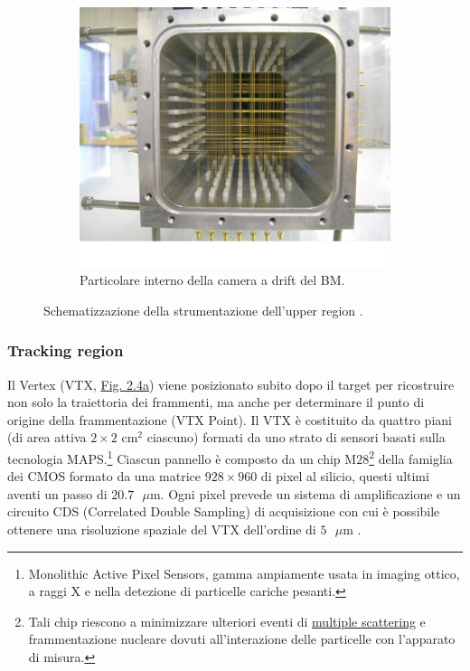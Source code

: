 \documentclass[12pt,a4paper,twoside]{report}
\begin{document}
\begin{figure}[H]
\begin{subfigure}[t]{0.49\textwidth}
			\includegraphics[width=\textwidth, scale=0.5]{beam_monitor.jpg}
			\caption{Particolare interno della camera a drift del BM.}
			\label{fig:beam_monitor}
		\end{subfigure}
		\caption{Schematizzazione della strumentazione dell'upper region \cite{slide_spighi}.}
	\end{figure}
	
	\subsubsection{Tracking region}
	Il Vertex (VTX, \hyperref[fig:vtx]{Fig. 2.4a}) viene posizionato subito dopo il target per ricostruire non solo la traiettoria dei frammenti, ma anche per determinare il punto di origine della frammentazione (VTX Point). Il VTX è costituito da quattro piani (di area attiva $2\times2\mbox{ cm}^2$ ciascuno) formati da uno strato di sensori basati sulla tecnologia MAPS.\footnote{Monolithic Active Pixel Sensors, gamma ampiamente usata in imaging ottico, a raggi X e nella detezione di particelle cariche pesanti.} Ciascun pannello è composto da un chip M$28$\footnote{Tali chip riescono a minimizzare ulteriori eventi di \hyperref[par:scattering_Rutherford]{multiple scattering} e frammentazione nucleare dovuti all'interazione delle particelle con l'apparato di misura.} della famiglia dei CMOS formato da una matrice $928\times960$ di pixel al silicio, questi ultimi aventi un passo di $20.7\mbox{ }\mu\mbox{m}$. Ogni pixel prevede un sistema di amplificazione e un circuito CDS (Correlated Double Sampling) di acquisizione con cui è possibile ottenere una risoluzione spaziale del VTX dell'ordine di $5\mbox{ }\mu\mbox{m}$ \cite{foot_cdr,ridolfiArticle}.
	
\end{document}
